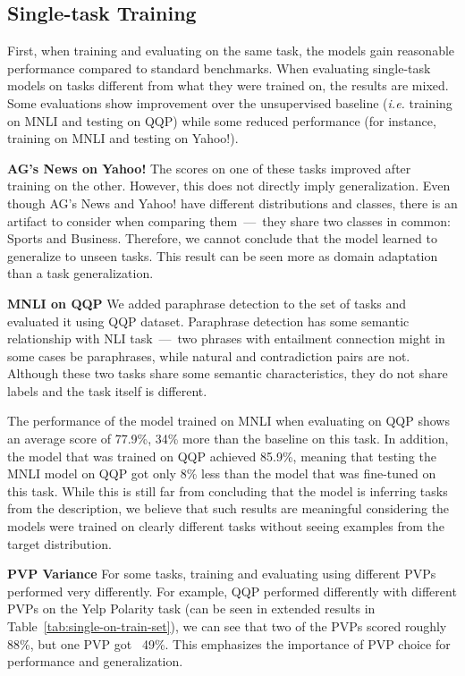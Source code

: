 \documentclass[11pt,a4paper]{article}
\newcommand{\subtitle}[1]{\vspace{5pt}\noindent\textbf{#1}\quad}
\begin{document}
\subsection{Single-task Training}
First, when training and evaluating on the same task, the models gain reasonable performance compared to standard benchmarks.
When evaluating single-task models on tasks different from what they were trained on, the results are mixed.
Some evaluations show improvement over the unsupervised baseline (\textit{i.e.} training on MNLI and testing on QQP)
while some reduced performance (for instance, training on MNLI and testing on Yahoo!).

\subtitle{AG's News on Yahoo!}
The scores on one of these tasks improved after training on the other.
However, this does not directly imply generalization.
Even though AG's News and Yahoo! have different distributions and classes, there is an artifact to consider when comparing them~---~they share two classes in common: Sports and Business.
Therefore, we cannot conclude that the model learned to generalize to unseen tasks.
This result can be seen more as domain adaptation than a task generalization.

\subtitle{MNLI on QQP}
We added paraphrase detection to the set of tasks and evaluated it using QQP dataset.
Paraphrase detection has some semantic relationship with NLI task~---~two phrases with entailment connection might in some cases be paraphrases, while natural and contradiction pairs are not.
Although these two tasks share some semantic characteristics, they do not share labels and the task itself is different.

The performance of the model trained on MNLI when evaluating on QQP shows an average score of 77.9\%,
34\% more than the baseline on this task.
In addition, the model that was trained on QQP achieved 85.9\%,
meaning that testing the MNLI model on QQP got only 8\% less than the model that was fine-tuned on this task.
While this is still far from concluding that the model is inferring tasks from the description, we believe that such results are meaningful considering the models were trained on clearly different tasks without seeing examples from the target distribution.

\subtitle{PVP Variance}
For some tasks, training and evaluating using different PVPs performed very differently.
For example, QQP performed differently with different PVPs on the Yelp Polarity task (can be seen in extended results in Table~\ref{tab:single-on-train-set}), we can see that two of the PVPs scored roughly 88\%, but one PVP got ~49\%.
This emphasizes the importance of PVP choice for performance and generalization.
\end{document}
